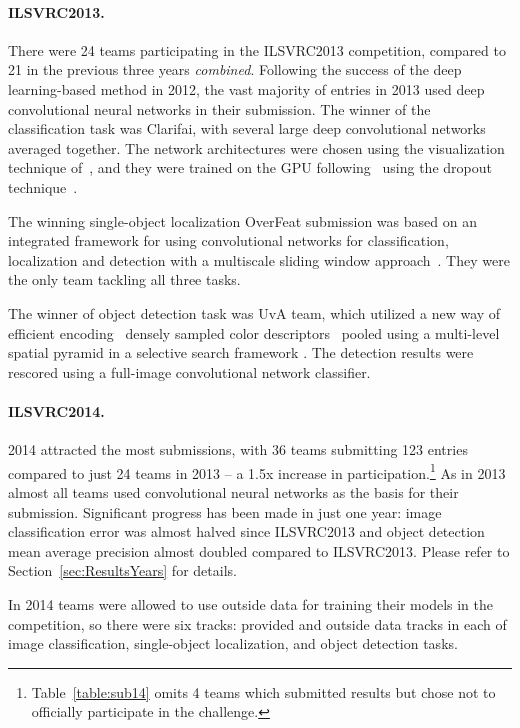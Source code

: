 \paragraph{ILSVRC2013.} There were 24 teams participating in the ILSVRC2013 competition, compared to 21 in the previous three years \emph{combined}. Following the success of the deep learning-based method in 2012, the vast majority of entries in 2013 used deep convolutional neural networks in their submission. The winner of the classification task was Clarifai, with several large deep convolutional networks averaged together. The network architectures were chosen using the visualization technique of~\citep{Zeiler13}, and they were trained on the GPU following~\citep{Zeiler11} using the dropout technique~\citep{Krizhevsky12}.

The winning single-object localization OverFeat submission was based on an integrated framework for using convolutional networks for classification, localization and detection with a multiscale sliding window approach~\citep{Sermanet13}. They were the only team tackling all three tasks. 

The winner of object detection task was UvA team, which utilized a new way of efficient encoding~\citep{vanDeSande14} densely sampled color descriptors~\citep{vanDeSande10} pooled using a multi-level spatial pyramid in a selective search framework \citep{Uijlings13}. The detection results were rescored using a full-image convolutional network classifier.


\paragraph{ILSVRC2014.} 2014 attracted the most submissions, with 36 teams submitting 123 entries compared to just 24 teams in 2013 -- a 1.5x increase in participation.\footnote{Table~\ref{table:sub14} omits 4 teams which submitted results but chose not to officially participate in the challenge.} As in 2013 almost all teams used convolutional neural networks as the basis for their submission. Significant progress has been made in just one year: image classification error was almost halved since ILSVRC2013 and object detection mean average precision almost doubled compared to ILSVRC2013. Please refer to Section~\ref{sec:ResultsYears} for details.

In 2014 teams were allowed to use outside data for training their models in the competition, so there were six tracks: provided and outside data tracks in each of image classification, single-object localization, and object detection tasks.  

